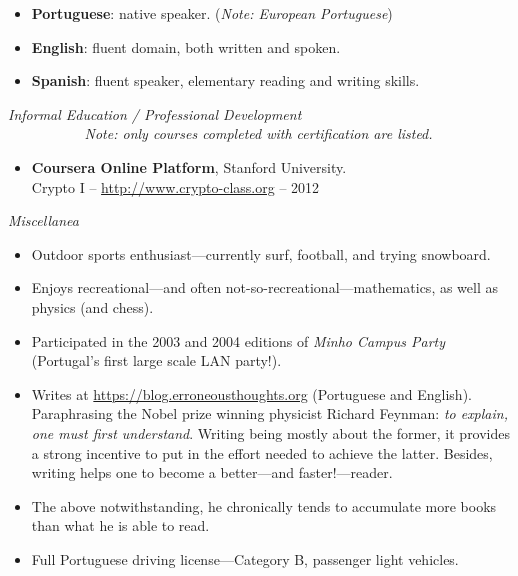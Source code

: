 \documentclass[a4paper,9pt]{extarticle}
\newenvironment{topic}[1]
   {{\noindent\large\bfseries\raisebox{0pt}[\height][1ex]{#1}\hrule}%
    \begin{list}{}{%
       \setlength{\leftmargin}{.0cm}}%
    \item[]}
   {\end{list}\medskip}
\begin{document}
\begin{topic}{Languages}
  \begin{itemize}[leftmargin=*]
    \item {\bfseries Portuguese}: native speaker. (\emph{Note: European 
      Portuguese})
    \item {\bfseries English}: fluent domain, both written and spoken.
    \item {\bfseries Spanish}: fluent speaker, elementary reading and writing skills.
  \end{itemize}
\end{topic}

\newpage   %
\begin{topic}{Additional Information}
  {\itshape Informal Education / Professional Development}\\ 
  {\slshape \small \mbox{\ \ \ \ \ \ \ \ \ \ } Note: only courses completed with certification are listed.}
  \begin{itemize}[leftmargin=*]
    \item {\bfseries Coursera Online Platform}, Stanford University.\\
      Crypto I -- \url{http://www.crypto-class.org} -- 2012
  \end{itemize}
  {\itshape Miscellanea}  
  \begin{itemize}[leftmargin=*]
    \item{Outdoor sports enthusiast---currently surf, football, and trying
      snowboard.}
    \item{Enjoys recreational---and often not-so-recreational---mathematics,
      as well as physics (and chess).}
    \item{Participated in the 2003 and 2004 editions of \emph{Minho Campus
      Party} (Portugal's first large scale LAN party!).}
    \item Writes at \url{https://blog.erroneousthoughts.org} (Portuguese and 
      English). Paraphrasing the Nobel prize winning physicist Richard Feynman: 
      \emph{to explain, one must first understand}. Writing being mostly about 
      the former, it provides a strong incentive to put in the effort needed to 
      achieve the latter. Besides, writing helps one to become a better---and 
      faster!---reader.
    \item The above notwithstanding, he chronically tends to accumulate more books than 
      what he is able to read.
    \item{Full Portuguese driving license---Category B, passenger light
      vehicles.}
  \end{itemize}
\end{topic}
\end{document}
